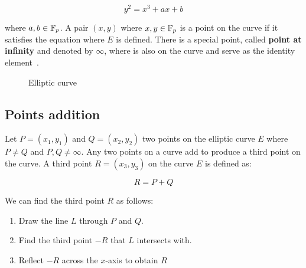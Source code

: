 \begin{equation*}
  y^2 = x^3 + ax + b
\end{equation*}

where $a, b \in \mathbb{F}_p$. A pair $(x, y)$ where $x, y \in \mathbb{F}_p$ is a point on the curve if it satisfies the equation where $E$ is defined. There is a special point, called \textbf{point at infinity} and denoted by $\infty$, where is also on the curve and serve as the identity element~\cite{elliptic_curves_2}.

\begin{figure}
  \centering
  \caption{Elliptic curve}
\end{figure}

\subsection[Points addition]{Points addition~\cite{elliptic_curves}}
\label{preliminaries:el_curves:addition}

Let $P = (x_1, y_1)$ and $Q = (x_2, y_2)$ two points on the elliptic curve $E$ where $P \neq Q$ and $P, Q \neq \infty$. Any two points on a curve add to produce a third point on the curve. A third point $R = (x_3, y_3)$ on the curve $E$ is defined as:

\begin{equation*}
  R = P + Q
\end{equation*}

We can find the third point $R$ as follows:

\begin{enumerate}
  \item Draw the line $L$ through $P$ and $Q$.
  \item Find the third point $-R$ that $L$ intersects with.
  \item Reflect $-R$ across the $x$-axis to obtain $R$
\end{enumerate}


